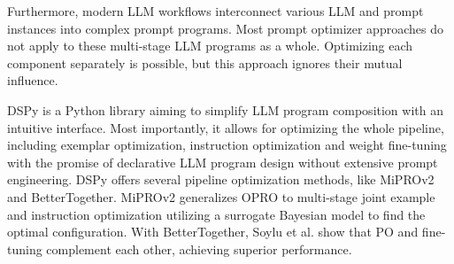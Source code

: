 Furthermore, modern LLM workflows interconnect various LLM and prompt instances into complex prompt programs.
Most prompt optimizer approaches do not apply to these multi-stage LLM programs\cite{opsahlong2024optimizinginstructionsdemonstrationsmultistage}
as a whole. Optimizing each component separately is possible, but this approach ignores their mutual influence.

DSPy\cite{khattab2023dspycompilingdeclarativelanguage} is a Python library aiming to simplify LLM program composition with 
an intuitive interface. Most importantly, it allows for optimizing the whole pipeline, including exemplar optimization, instruction optimization and weight fine-tuning
with the promise of declarative LLM program design without extensive prompt engineering. DSPy offers several pipeline optimization
methods, like MiPROv2\cite{opsahlong2024optimizinginstructionsdemonstrationsmultistage} and BetterTogether\cite{soylu2024finetuningpromptoptimizationgreat}.
MiPROv2 generalizes OPRO\cite{yang2024largelanguagemodelsoptimizers} to multi-stage joint example and instruction optimization
utilizing a surrogate Bayesian model to find the optimal configuration. With BetterTogether, Soylu et al. show that PO and fine-tuning
complement each other, achieving superior performance.

